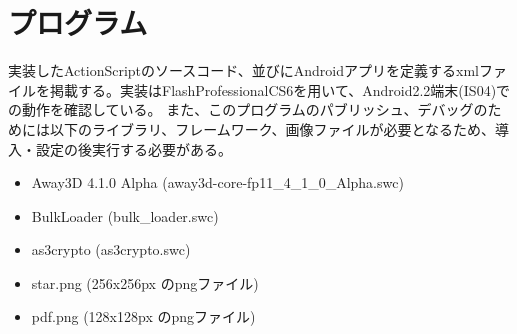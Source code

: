 \chapter{プログラム}
実装したActionScriptのソースコード、並びにAndroidアプリを定義するxmlファイルを掲載する。実装はFlashProfessionalCS6を用いて、Android2.2端末(IS04)での動作を確認している。
また、このプログラムのパブリッシュ、デバッグのためには以下のライブラリ、フレームワーク、画像ファイルが必要となるため、導入・設定の後実行する必要がある。
\begin{itemize}
\item Away3D 4.1.0 Alpha (away3d-core-fp11\_4\_1\_0\_Alpha.swc)
\item BulkLoader (bulk\_loader.swc)
\item as3crypto (as3crypto.swc)
\item star.png (256x256px のpngファイル)
\item pdf.png (128x128px のpngファイル)
\end{itemize}

